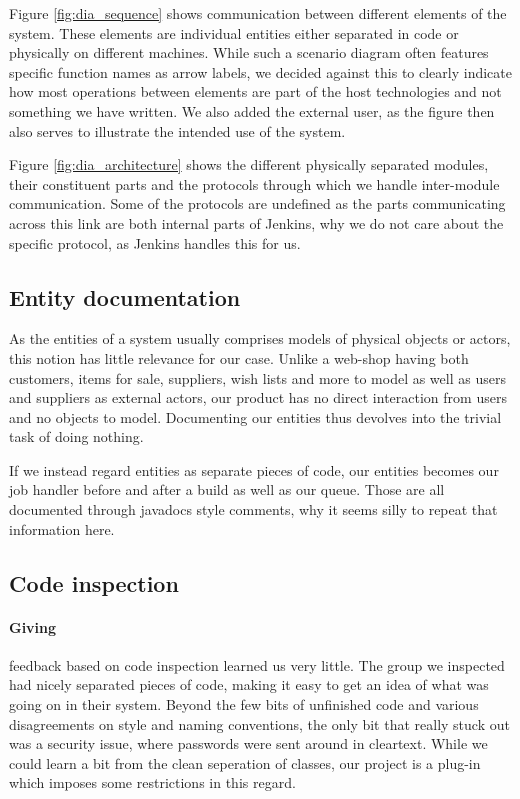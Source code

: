\documentclass[a4paper]{article}
\begin{document}
Figure \ref{fig:dia_sequence} shows communication between different elements of
the system. These elements are individual entities either separated in code or
physically on different machines. While such a scenario diagram often features
specific function names as arrow labels, we decided against this to clearly
indicate how most operations between elements are part of the host technologies
and not something we have written. We also added the external user, as the figure
then also serves to illustrate the intended use of the system.

Figure \ref{fig:dia_architecture} shows the different physically separated modules,
their constituent parts and the protocols through which we handle inter-module
communication. Some of the protocols are undefined as the parts communicating
across this link are both internal parts of Jenkins, why we do not care about the
specific protocol, as Jenkins handles this for us. 

\subsection{Entity documentation}
As the entities of a system usually comprises models of physical objects or actors,
this notion has little relevance for our case. Unlike a web-shop having both
customers, items for sale, suppliers, wish lists and more to model as well as
users and suppliers as external actors, our product has no direct interaction from
users and no objects to model. Documenting our entities thus devolves into the
trivial task of doing nothing.

If we instead regard entities as separate pieces of code, our entities becomes our
job handler before and after a build as well as our queue. Those are all
documented through javadocs style comments, why it seems silly to repeat that information
here.

\subsection{Code inspection}
\label{sec:inspection}
\paragraph{Giving} feedback based on code inspection learned us very little. The
group we inspected had nicely separated pieces of code, making it easy to get an
idea of what was going on in their system. Beyond the few bits of unfinished code
and various disagreements on style and naming conventions, the only bit that
really stuck out was a security issue, where passwords were sent around in
cleartext. While we could learn a bit from the clean seperation of classes, our
project is a plug-in which imposes some restrictions in this regard.
\end{document}
